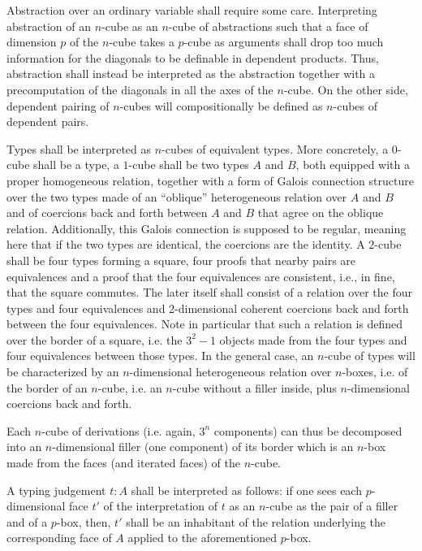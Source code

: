 \documentclass{article}
\begin{document}
Abstraction over an ordinary variable shall require some
care. Interpreting abstraction of an $n$-cube as an $n$-cube of
abstractions such that a face of dimension $p$ of the $n$-cube takes a
$p$-cube as arguments shall drop too much information for the
diagonals to be definable in dependent products. Thus, abstraction
shall instead be interpreted as the abstraction together with a
precomputation of the diagonals in all the axes of the $n$-cube. On
the other side, dependent pairing of $n$-cubes will compositionally be
defined as $n$-cubes of dependent pairs.

Types shall be interpreted as $n$-cubes of equivalent types. More
concretely, a $0$-cube shall be a type, a $1$-cube shall be two types
$A$ and $B$, both equipped with a proper homogeneous relation,
together with a form of Galois connection structure over the two
types made of an ``oblique'' heterogeneous relation over $A$ and $B$
and of coercions back and forth between $A$ and $B$ that agree on the
oblique relation. Additionally, this Galois connection is supposed to
be regular, meaning here that if the two types are identical, the
coercions are the identity. A $2$-cube shall be four types forming a
square, four proofs that nearby pairs are equivalences and a proof
that the four equivalences are consistent, i.e., in fine, that the square
commutes. The later itself shall consist of a relation over the four
types and four equivalences and 2-dimensional coherent coercions back
and forth between the four equivalences. Note in particular that such
a relation is defined over the border of a square, i.e. the $3^2 - 1$
objects made from the four types and four equivalences between those
types. In the general case, an $n$-cube of types will be characterized
by an $n$-dimensional heterogeneous relation over $n$-boxes, i.e. of
the border of an $n$-cube, i.e. an $n$-cube without a filler inside,
plus $n$-dimensional coercions back and forth.

Each $n$-cube of derivations (i.e. again, $3^n$ components) can thus
be decomposed into an $n$-dimensional filler (one component) of its
border which is an $n$-box made from the faces (and iterated faces) of
the $n$-cube.

A typing judgement $t:A$ shall be interpreted as follows: if one sees
each $p$-dimensional face $t'$ of the interpretation of $t$ as an
$n$-cube as the pair of a filler and of a $p$-box, then, $t'$ shall be
an inhabitant of the relation underlying the corresponding face of $A$
applied to the aforementioned $p$-box.
\end{document}
